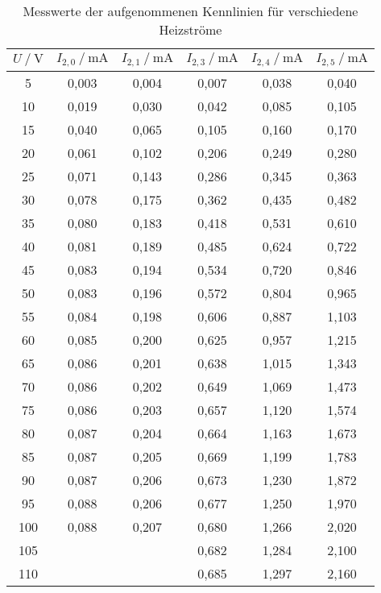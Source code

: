 \begin{table}[H]
   \centering
   \caption{Messwerte der aufgenommenen Kennlinien für verschiedene Heizströme}
   \label{tab:kenn}
   \begin{tabular} { c S S S S S }
 \toprule
 {$U\:/\: \mathrm{V}$} & {$I_{2,0}\:/\: \mathrm{mA}$} & {$I_{2,1}\:/\: \mathrm{mA}$} & {$I_{2,3}\:/\: \mathrm{mA}$} & {$I_{2,4}\:/\: \mathrm{mA}$} & {$I_{2,5}\:/\: \mathrm{mA}$} \\
     & 0,003 & 0,004 & 0,007 & 0,038 & 0,040 \\
    10 & 0,019 & 0,030 & 0,042 & 0,085 & 0,105 \\
    15 & 0,040 & 0,065 & 0,105 & 0,160 & 0,170 \\
    20 & 0,061 & 0,102 & 0,206 & 0,249 & 0,280 \\
    25 & 0,071 & 0,143 & 0,286 & 0,345 & 0,363 \\
    30 & 0,078 & 0,175 & 0,362 & 0,435 & 0,482 \\
    35 & 0,080 & 0,183 & 0,418 & 0,531 & 0,610 \\
    40 & 0,081 & 0,189 & 0,485 & 0,624 & 0,722 \\
    45 & 0,083 & 0,194 & 0,534 & 0,720 & 0,846 \\
    50 & 0,083 & 0,196 & 0,572 & 0,804 & 0,965 \\
    55 & 0,084 & 0,198 & 0,606 & 0,887 & 1,103 \\
    60 & 0,085 & 0,200 & 0,625 & 0,957 & 1,215 \\
    65 & 0,086 & 0,201 & 0,638 & 1,015 & 1,343 \\
    70 & 0,086 & 0,202 & 0,649 & 1,069 & 1,473 \\
    75 & 0,086 & 0,203 & 0,657 & 1,120 & 1,574 \\
    80 & 0,087 & 0,204 & 0,664 & 1,163 & 1,673 \\
    85 & 0,087 & 0,205 & 0,669 & 1,199 & 1,783 \\
    90 & 0,087 & 0,206 & 0,673 & 1,230 & 1,872 \\
    95 & 0,088 & 0,206 & 0,677 & 1,250 & 1,970 \\
    100 & 0,088 & 0,207 & 0,680 & 1,266 & 2,020 \\
    105 &  &  & 0,682 & 1,284 & 2,100 \\
    110 &  &  & 0,685 & 1,297 & 2,160 \\
    \bottomrule
  \end{tabular}
\end{table}
